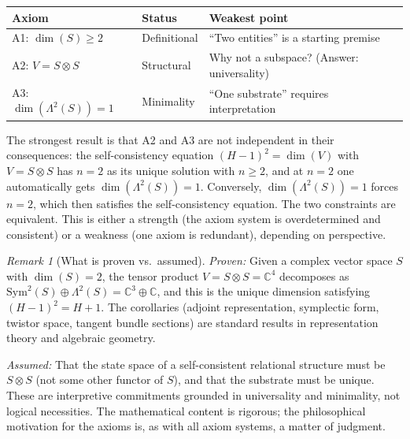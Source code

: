\documentclass[11pt,a4paper]{article}
\theoremstyle{definition}
\theoremstyle{remark}
\newtheorem*{remark*}{Remark}
\newcommand{\C}{\mathbb{C}}
\newcommand{\Sym}{\mathrm{Sym}}
\begin{document}
\begin{center}
\renewcommand{\arraystretch}{1.3}
\begin{tabular}{lll}
\textbf{Axiom} & \textbf{Status} & \textbf{Weakest point} \\
\hline
A1: $\dim(S)\geq 2$ & Definitional &
``Two entities'' is a starting premise \\
A2: $V=S\otimes S$ & Structural &
Why not a subspace? (Answer: universality) \\
A3: $\dim(\Lambda^2(S))=1$ & Minimality &
``One substrate'' requires interpretation \\
\end{tabular}
\end{center}

\medskip\noindent
The strongest result is that A2 and A3 are not independent in their
consequences: the self-consistency equation $(H-1)^2=\dim(V)$ with
$V=S\otimes S$ has $n=2$ as its unique solution with $n\geq 2$, and at
$n=2$ one automatically gets $\dim(\Lambda^2(S))=1$.
Conversely, $\dim(\Lambda^2(S))=1$ forces $n=2$, which then satisfies
the self-consistency equation.
The two constraints are equivalent.
This is either a strength (the axiom system is overdetermined and
consistent) or a weakness (one axiom is redundant), depending on
perspective.

\bigskip
\begin{remark*}[What is proven vs.\ assumed]
\emph{Proven:} Given a complex vector space $S$ with $\dim(S)=2$, the
tensor product $V=S\otimes S=\C^4$ decomposes as
$\Sym^2(S)\oplus\Lambda^2(S)=\C^3\oplus\C$, and this is the unique
dimension satisfying $(H-1)^2=H+1$.
The corollaries (adjoint representation, symplectic form, twistor space,
tangent bundle sections) are standard results in representation theory
and algebraic geometry.

\emph{Assumed:} That the state space of a self-consistent relational
structure must be $S\otimes S$ (not some other functor of $S$), and
that the substrate must be unique.
These are interpretive commitments grounded in universality and
minimality, not logical necessities.
The mathematical content is rigorous; the philosophical motivation for
the axioms is, as with all axiom systems, a matter of judgment.
\end{remark*}
\end{document}
